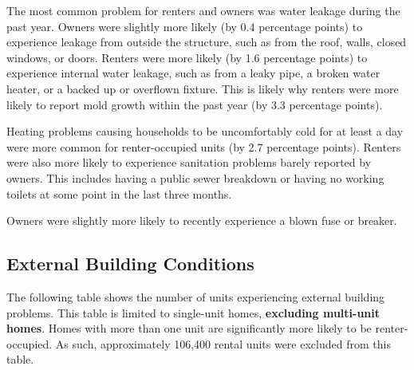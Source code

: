\documentclass[
]{book}
\begin{document}
The most common problem for renters and owners was water leakage during the past year. Owners were slightly more likely (by 0.4 percentage points) to experience leakage from outside the structure, such as from the roof, walls, closed windows, or doors. Renters were more likely (by 1.6 percentage points) to experience internal water leakage, such as from a leaky pipe, a broken water heater, or a backed up or overflown fixture. This is likely why renters were more likely to report mold growth within the past year (by 3.3 percentage points).

Heating problems causing households to be uncomfortably cold for at least a day were more common for renter-occupied units (by 2.7 percentage points). Renters were also more likely to experience sanitation problems barely reported by owners. This includes having a public sewer breakdown or having no working toilets at some point in the last three months.

Owners were slightly more likely to recently experience a blown fuse or breaker.

\hypertarget{external-building-conditions}{%
\subsection{External Building Conditions}\label{external-building-conditions}}

The following table shows the number of units experiencing external building problems. This table is limited to single-unit homes, \textbf{excluding multi-unit homes}. Homes with more than one unit are significantly more likely to be renter-occupied. As such, approximately 106,400 rental units were excluded from this table.
\end{document}
